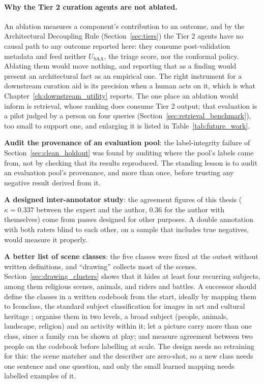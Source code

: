 \documentclass[12pt,a4paper]{report}
\begin{document}
\paragraph{Why the Tier 2 curation agents are not ablated.} An ablation measures a component's contribution to an outcome, and by the Architectural Decoupling Rule (Section~\ref{sec:tiers}) the Tier 2 agents have no causal path to any outcome reported here: they consume post-validation metadata and feed neither $U_{\text{SAA}}$, the triage score, nor the conformal policy. Ablating them would move nothing, and reporting that as a finding would present an architectural fact as an empirical one. The right instrument for a downstream curation aid is its precision when a human acts on it, which is what Chapter~\ref{ch:downstream_utility} reports. The one place an ablation would inform is retrieval, whose ranking does consume Tier 2 output; that evaluation is a pilot judged by a person on four queries (Section~\ref{sec:retrieval_benchmark}), too small to support one, and enlarging it is listed in Table~\ref{tab:future_work}.

\textbf{Audit the provenance of an evaluation pool}: the label-integrity failure of Section~\ref{sec:clean_holdout} was found by auditing where the pool's labels came from, not by checking that its results reproduced. The standing lesson is to audit an evaluation pool's provenance, and more than once, before trusting any negative result derived from it.

\textbf{A designed inter-annotator study}: the agreement figures of this thesis ($\kappa=0.337$ between the expert and the author, $0.36$ for the author with themselves) come from passes designed for other purposes. A double annotation with both raters blind to each other, on a sample that includes true negatives, would measure it properly.

\textbf{A better list of scene classes}: the five classes were fixed at the outset without written definitions, and ``drawing'' collects most of the scenes. Section~\ref{sec:drawing_clusters} shows that it hides at least four recurring subjects, among them religious scenes, animals, and riders and battles. A successor should define the classes in a written codebook from the start, ideally by mapping them to Iconclass, the standard subject classification for images in art and cultural heritage \cite{iconclass}; organise them in two levels, a broad subject (people, animals, landscape, religion) and an activity within it; let a picture carry more than one class, since a family can be shown at play; and measure agreement between two people on the codebook before labelling at scale. The design needs no retraining for this: the scene matcher and the describer are zero-shot, so a new class needs one sentence and one question, and only the small learned mapping needs labelled examples of it.
\end{document}
